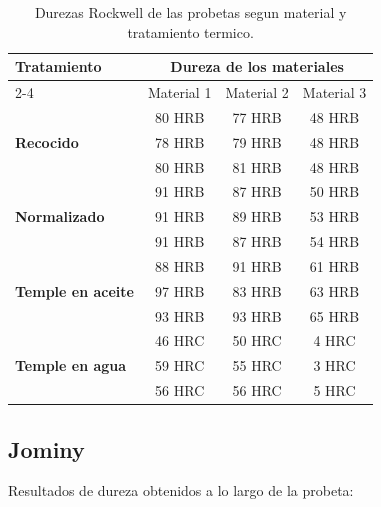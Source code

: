 \documentclass[12pt,a4paper]{article}
\begin{document}
\begin{table}[H]
    \centering
    \begin{tabular}{l|ccc}
        \hline
        \multirow{2}{*}{\textbf{Tratamiento}} & \multicolumn{3}{c}{\textbf{Dureza de los materiales}}\\ \cline{2-4}
         & Material 1 & Material 2 & Material 3\\ \hline
        \multirow{3}{*}{\textbf{Recocido}} & 80 HRB & 77 HRB & 48 HRB \\
         & 78 HRB & 79 HRB & 48 HRB \\
         & 80 HRB & 81 HRB & 48 HRB \\ \hline
        \multirow{3}{*}{\textbf{Normalizado}} & 91 HRB & 87 HRB & 50 HRB \\
         & 91 HRB & 89 HRB & 53 HRB \\
         & 91 HRB & 87 HRB & 54 HRB \\ \hline
        \multirow{3}{*}{\textbf{Temple en aceite}} & 88 HRB & 91 HRB & 61 HRB \\
         & 97 HRB & 83 HRB & 63 HRB \\
         & 93 HRB & 93 HRB & 65 HRB \\ \hline
        \multirow{3}{*}{\textbf{Temple en agua}} & 46 HRC & 50 HRC & 4 HRC \\
         & 59 HRC & 55 HRC & 3 HRC \\
         & 56 HRC & 56 HRC & 5 HRC \\
        \hline
    \end{tabular}
    \caption{Durezas Rockwell de las probetas segun material y tratamiento termico.}
\end{table}

\subsection{Jominy}
Resultados de dureza obtenidos a lo largo de la probeta:
\end{document}
